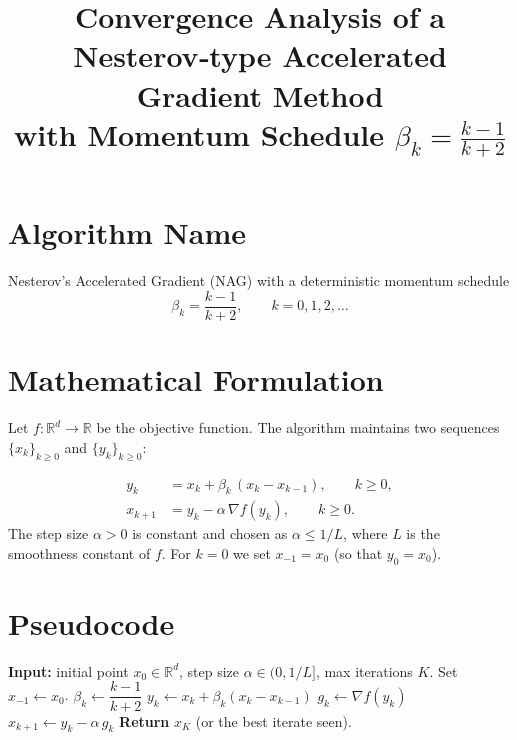 \documentclass[11pt]{article}
\newcommand{\R}{\mathbb{R}}
\begin{document}
\title{Convergence Analysis of a Nesterov‑type Accelerated Gradient Method\\
with Momentum Schedule $\displaystyle \beta_k=\frac{k-1}{k+2}$}
\author{}
\date{}
\maketitle

\tableofcontents
\newpage

\section*{Algorithm Name}
Nesterov’s Accelerated Gradient (NAG) with a deterministic momentum schedule  
\[
\beta_k=\frac{k-1}{k+2},\qquad k=0,1,2,\dots
\]

\section{Mathematical Formulation}
Let $f:\R^d\to\R$ be the objective function.  
The algorithm maintains two sequences $\{x_k\}_{k\ge 0}$ and $\{y_k\}_{k\ge 0}$:

\begin{align}
y_k &= x_k + \beta_k\,(x_k-x_{k-1}), \qquad k\ge 0,\label{eq:y}\\[4pt]
x_{k+1} &= y_k - \alpha\,\nabla f(y_k), \qquad k\ge 0.\label{eq:x}
\end{align}
The step size $\alpha>0$ is constant and chosen as $\alpha\le 1/L$, where $L$ is the smoothness constant of $f$.  
For $k=0$ we set $x_{-1}=x_0$ (so that $y_0=x_0$).

\section{Pseudocode}
\begin{algorithm}[H]
\caption{Accelerated Gradient with $\beta_k=\frac{k-1}{k+2}$}
\begin{algorithmic}[1]
\State \textbf{Input:} initial point $x_0\in\R^d$, step size $\alpha\in(0,1/L]$, max iterations $K$.
\State Set $x_{-1}\gets x_0$.
    \State $\beta_k \gets \dfrac{k-1}{k+2}$          
    \State $y_k \gets x_k + \beta_k (x_k - x_{k-1})$ 
    \State $g_k \gets \nabla f(y_k)$                
    \State $x_{k+1} \gets y_k - \alpha\, g_k$       
\EndFor
\State \textbf{Return} $x_K$ (or the best iterate seen).
\end{algorithmic}
\end{algorithm}
\end{document}
